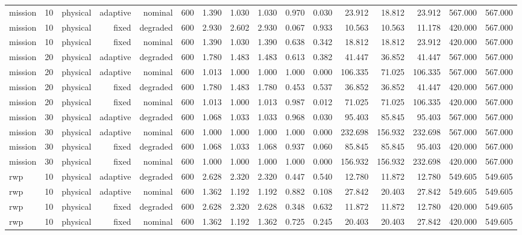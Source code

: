 \begin{tabular}{lrrrrrrrrrrrrrrr}
mission & 10 & physical & adaptive & nominal & 600 & 1.390 & 1.030 & 1.030 & 0.970 & 0.030 & 23.912 & 18.812 & 23.912 & 567.000 & 567.000 \\
mission & 10 & physical & fixed & degraded & 600 & 2.930 & 2.602 & 2.930 & 0.067 & 0.933 & 10.563 & 10.563 & 11.178 & 420.000 & 567.000 \\
mission & 10 & physical & fixed & nominal & 600 & 1.390 & 1.030 & 1.390 & 0.638 & 0.342 & 18.812 & 18.812 & 23.912 & 420.000 & 567.000 \\
mission & 20 & physical & adaptive & degraded & 600 & 1.780 & 1.483 & 1.483 & 0.613 & 0.382 & 41.447 & 36.852 & 41.447 & 567.000 & 567.000 \\
mission & 20 & physical & adaptive & nominal & 600 & 1.013 & 1.000 & 1.000 & 1.000 & 0.000 & 106.335 & 71.025 & 106.335 & 567.000 & 567.000 \\
mission & 20 & physical & fixed & degraded & 600 & 1.780 & 1.483 & 1.780 & 0.453 & 0.537 & 36.852 & 36.852 & 41.447 & 420.000 & 567.000 \\
mission & 20 & physical & fixed & nominal & 600 & 1.013 & 1.000 & 1.013 & 0.987 & 0.012 & 71.025 & 71.025 & 106.335 & 420.000 & 567.000 \\
mission & 30 & physical & adaptive & degraded & 600 & 1.068 & 1.033 & 1.033 & 0.968 & 0.030 & 95.403 & 85.845 & 95.403 & 567.000 & 567.000 \\
mission & 30 & physical & adaptive & nominal & 600 & 1.000 & 1.000 & 1.000 & 1.000 & 0.000 & 232.698 & 156.932 & 232.698 & 567.000 & 567.000 \\
mission & 30 & physical & fixed & degraded & 600 & 1.068 & 1.033 & 1.068 & 0.937 & 0.060 & 85.845 & 85.845 & 95.403 & 420.000 & 567.000 \\
mission & 30 & physical & fixed & nominal & 600 & 1.000 & 1.000 & 1.000 & 1.000 & 0.000 & 156.932 & 156.932 & 232.698 & 420.000 & 567.000 \\
rwp & 10 & physical & adaptive & degraded & 600 & 2.628 & 2.320 & 2.320 & 0.447 & 0.540 & 12.780 & 11.872 & 12.780 & 549.605 & 549.605 \\
rwp & 10 & physical & adaptive & nominal & 600 & 1.362 & 1.192 & 1.192 & 0.882 & 0.108 & 27.842 & 20.403 & 27.842 & 549.605 & 549.605 \\
rwp & 10 & physical & fixed & degraded & 600 & 2.628 & 2.320 & 2.628 & 0.348 & 0.632 & 11.872 & 11.872 & 12.780 & 420.000 & 549.605 \\
rwp & 10 & physical & fixed & nominal & 600 & 1.362 & 1.192 & 1.362 & 0.725 & 0.245 & 20.403 & 20.403 & 27.842 & 420.000 & 549.605 \\

\end{tabular}
